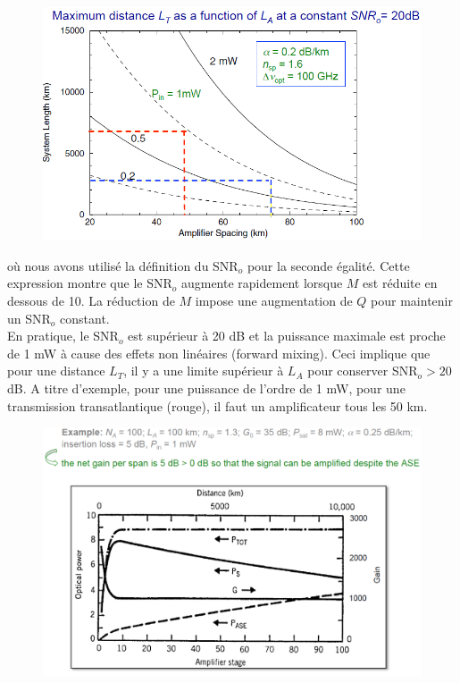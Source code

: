 	\begin{figure}
	\vspace{-5mm}
	\includegraphics[scale=0.37]{ch6/image16}
	\end{figure}
où nous avons utilisé la définition du SNR$_o$ pour la seconde égalité. Cette expression montre que 
le SNR$_o$ augmente rapidement lorsque $M$ est réduite en dessous de 10. La réduction de $M$ impose une 
augmentation de $Q$ pour maintenir un SNR$_o$ constant.\\

En pratique, le SNR$_o$ est supérieur à 20 dB et la puissance maximale est proche de 1 mW à cause des effets
non linéaires (forward mixing). Ceci implique que pour une distance $L_T$, il y a une limite supérieur à 
$L_A$ pour conserver SNR$_o>20$ dB. A titre d'exemple, pour une puissance de l'ordre de 1 mW, pour une
transmission transatlantique (rouge), il faut un amplificateur tous les 50 km. 
\newpage
	\begin{figure}
	\includegraphics[scale=0.3]{ch6/image17}
	\end{figure}



